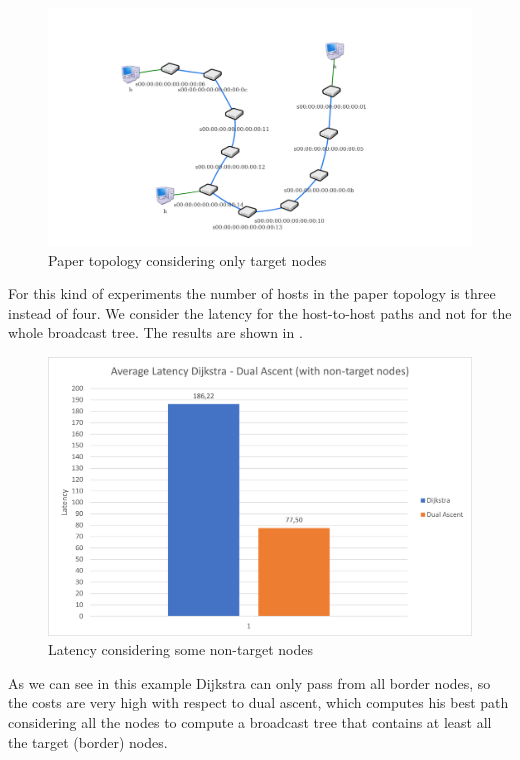 \begin{figure}
	\centering
	\includegraphics[width=\textwidth]{img/paper-topo-onlytarget.png}
	\caption{Paper topology considering only target
	nodes}\label{fig:paper-target}
\end{figure}

For this kind of experiments the number of hosts in the paper topology is three
instead of four. We consider the latency for the host-to-host paths and not for
the whole broadcast tree. The results are shown in
.

\begin{figure}
	\centering
	\includegraphics[width=\textwidth]{img/lat-mean-target.png}
	\caption{Latency considering some non-target
	nodes}\label{fig:lat-mean-target}
\end{figure}

As we can see in this example Dijkstra can only pass from all border nodes, so
the costs are very high with respect to dual ascent, which computes his best
path considering all the nodes to compute a broadcast tree that contains at
least all the target (border) nodes.
